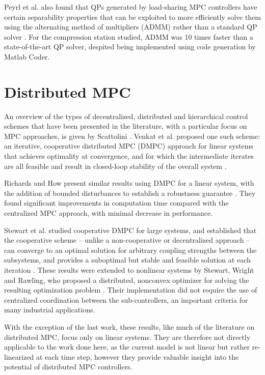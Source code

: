 Peyrl et al. also found that QPs generated by load-sharing MPC controllers have certain separability properties that can be exploited to more efficiently solve them using the alternating method of multipliers (ADMM) rather than a standard QP solver \cite{Peyrl2015}. For the compression station studied, ADMM was 10 times faster than a state-of-the-art QP solver, despited being implemented using code generation by Matlab Coder.





\section{Distributed MPC}
\label{sec:lit:dmpc}

An overview of the types of decentralized, distributed and hierarchical control schemes that have been presented in the literature, with a particular focus on MPC approaches, is given by Scattolini \cite{Scattolini2009}.
Venkat et al. proposed one such scheme: an iterative, cooperative distributed MPC (DMPC) approach for linear systems that achieves optimality at convergence, and for which the intermediate iterates are all feasible and result in closed-loop stability of the overall system \cite{Venkat2005}.

Richards and How present similar results using DMPC for a linear system, with the addition of bounded disturbances to establish a robustness guarantee \cite{Richards2007}.
They found significant improvements in computation time compared with the centralized MPC approach, with minimal decrease in performance.

Stewart et al. studied cooperative DMPC for large systems, and established that the cooperative scheme -- unlike a non-cooperative or decentralized approach -- can converge to an optimal solution for arbitrary coupling strengths between the subsystems, and provides a suboptimal but stable and feasible solution at each iteration \cite{Stewart2010}.
These results were extended to nonlinear systems by Stewart, Wright and Rawling, who proposed a distributed, nonconvex optimizer for solving the resulting optimization problem \cite{Stewart2011}.
Their implementation did not require the use of centralized coordination between the sub-controllers, an important criteria for many industrial applications.

With the exception of the last work, these results, like much of the literature on distributed MPC, focus only on linear systems. 
They are therefore not directly applicable to the work done here, as the current model is not linear but rather re-linearized at each time step, however they provide valuable insight into the potential of distributed MPC controllers.

